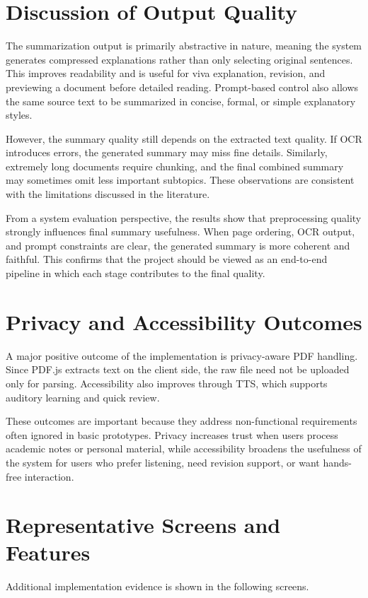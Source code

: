 \documentclass[12pt, a4paper]{report}
\begin{document}
\section{Discussion of Output Quality}
The summarization output is primarily abstractive in nature, meaning the system generates compressed explanations rather than only selecting original sentences. This improves readability and is useful for viva explanation, revision, and previewing a document before detailed reading. Prompt-based control also allows the same source text to be summarized in concise, formal, or simple explanatory styles.

However, the summary quality still depends on the extracted text quality. If OCR introduces errors, the generated summary may miss fine details. Similarly, extremely long documents require chunking, and the final combined summary may sometimes omit less important subtopics. These observations are consistent with the limitations discussed in the literature.

From a system evaluation perspective, the results show that preprocessing quality strongly influences final summary usefulness. When page ordering, OCR output, and prompt constraints are clear, the generated summary is more coherent and faithful. This confirms that the project should be viewed as an end-to-end pipeline in which each stage contributes to the final quality.

\section{Privacy and Accessibility Outcomes}
A major positive outcome of the implementation is privacy-aware PDF handling. Since PDF.js extracts text on the client side, the raw file need not be uploaded only for parsing. Accessibility also improves through TTS, which supports auditory learning and quick review.

These outcomes are important because they address non-functional requirements often ignored in basic prototypes. Privacy increases trust when users process academic notes or personal material, while accessibility broadens the usefulness of the system for users who prefer listening, need revision support, or want hands-free interaction.

\section{Representative Screens and Features}
Additional implementation evidence is shown in the following screens.
\end{document}
